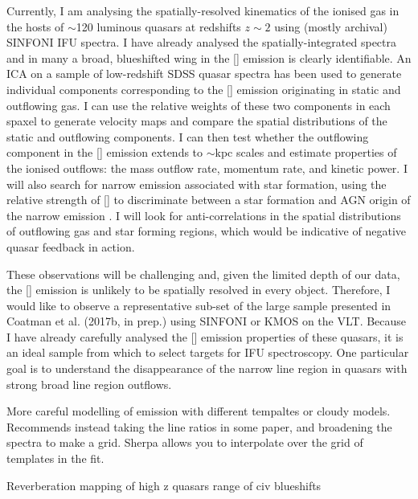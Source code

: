 Currently, I am analysing the spatially-resolved kinematics of the ionised gas in the hosts of $\sim$120 luminous quasars at redshifts $z\sim2$ using (mostly archival) SINFONI IFU spectra. 
I have already analysed the spatially-integrated spectra and in many a broad, blueshifted wing in the [] emission is clearly identifiable. 
An ICA on a sample of low-redshift SDSS quasar spectra has been used to generate individual components corresponding to the [] emission originating in static and outflowing gas. 
I can use the relative weights of these two components in each spaxel to generate velocity maps and compare the spatial distributions of the static and outflowing components.
I can then test whether the outflowing component in the [] emission extends to $\sim$kpc scales and
estimate properties of the ionised outflows: the mass outflow rate, momentum rate, and kinetic power.
I will also search for narrow \ha emission associated with star formation, using the relative strength of [] to discriminate between a star formation and AGN origin of the narrow \ha emission \citep{susie16}. 
I will look for anti-correlations in the spatial distributions of outflowing gas and star forming regions, which would be indicative of negative quasar feedback in action.

These observations will be challenging and, given the limited depth of our data, the [] emission is unlikely to be spatially resolved in every object. 
Therefore, I would like to observe a representative sub-set of the large sample presented in Coatman et al. (2017b, in prep.) using SINFONI or KMOS on the VLT. 
Because I have already carefully analysed the [] emission properties of these quasars, it is an ideal sample from which to select targets for IFU spectroscopy. 
One particular goal is to understand the disappearance of the narrow line region in quasars with strong broad line region outflows. 

More careful modelling of  emission with different tempaltes or cloudy models. 
Recommends instead taking the line ratios in some paper, and broadening the spectra to make a grid. Sherpa allows you to interpolate over the grid of templates in the fit. 




Reverberation mapping of high z quasars
range of civ blueshifts
